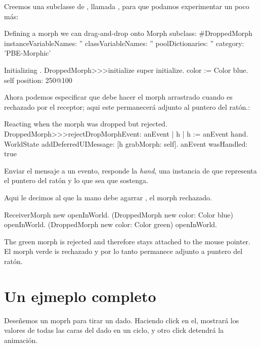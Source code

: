 \documentclass[a4paper,10pt,twoside]{book}
\begin{document}
Creemos una subclasse de , llamada , para que podamos experimentar un poco m\'as:

\begin{classdef}{Defining a morph we can drag-and-drop onto }
Morph subclass: #DroppedMorph
	instanceVariableNames: ''
	classVariableNames: ''
	poolDictionaries: ''
	category: 'PBE-Morphic'
\end{classdef}

\begin{method}{Initializing .}
DroppedMorph>>>initialize
	super initialize.
	color := Color blue.
	self position: 250@100
\end{method}

Ahora podemos especificar que debe hacer el morph arrastrado cuando es rechazado por el receptor; aqui este permanecer\'a adjunto al puntero del rat\'on.:

\begin{method}{Reacting when the morph was dropped but rejected.}
DroppedMorph>>>rejectDropMorphEvent: anEvent
	| h |
	h := anEvent hand.
	WorldState
		addDeferredUIMessage: [h grabMorph: self].
	anEvent wasHandled: true
\end{method}

Enviar el mensaje  a un evento, responde la \emph{hand}, una instancia de  que representa el puntero del rat\'on y lo que sea que sostenga.

Aqui le decimos al  que la mano debe agarrar , el morph rechazado.

\begin{code}{}
ReceiverMorph new openInWorld.
(DroppedMorph new color: Color blue) openInWorld.
(DroppedMorph new color: Color green) openInWorld.
\end{code}
\noindent
The green morph is rejected and therefore stays attached to the mouse pointer.
El morph verde is rechazado y por lo tanto permanece adjunto a puntero del rat\'on.

\section{Un ejmeplo completo}

Deseñemos un moprh para tirar un dado. Haciendo click en el, mostrar\'a los valores de todas las caras del dado en un ciclo, y otro click detendr\'a la animaci\'on.
\end{document}
